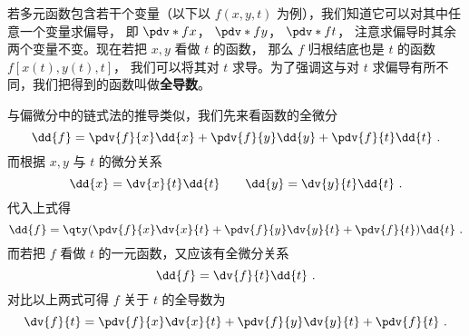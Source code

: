 

若多元函数包含若干个变量（以下以 $f(x,y,t)$ 为例），我们知道它可以对其中任意一个变量求偏导， 即 $\pdv*{f}{x}$，  $\pdv*{f}{y}$，  $\pdv*{f}{t}$， 注意求偏导时其余两个变量不变。现在若把 $x,y$ 看做 $t$ 的函数， 那么 $f$ 归根结底也是 $t$ 的函数 $f[x(t),y(t),t]$， 我们可以将其对 $t$ 求导。为了强调这与对 $t$ 求偏导有所不同，我们把得到的函数叫做\textbf{全导数}。

与偏微分中的链式法的推导类似，我们先来看函数的全微分
\begin{equation}
\dd{f} = \pdv{f}{x} \dd{x} + \pdv{f}{y} \dd{y} + \pdv{f}{t} \dd{t}~.
\end{equation}
而根据 $x,y$ 与 $t$ 的微分关系
\begin{equation}
\dd{x} = \dv{x}{t} \dd{t} \qquad  \dd{y} = \dv{y}{t} \dd{t}~.
\end{equation}
代入上式得
\begin{equation}
\dd{f} = \qty( \pdv{f}{x}\dv{x}{t} + \pdv{f}{y}\dv{y}{t} + \pdv{f}{t} )\dd{t}~.
\end{equation}
而若把 $f$ 看做 $t$ 的一元函数，又应该有全微分关系
\begin{equation}
\dd{f} = \dv{f}{t} \dd{t}~.
\end{equation}
对比以上两式可得 $f$ 关于 $t$ 的全导数为
\begin{equation}\label{eq_TotDer_1}
\dv{f}{t} = \pdv{f}{x}\dv{x}{t} + \pdv{f}{y}\dv{y}{t} + \pdv{f}{t}~.
\end{equation}

